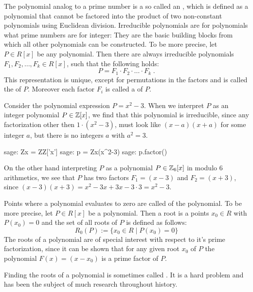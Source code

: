 The polynomial analog to a prime number is a so called an , which is defined as a polynomial that cannot be factored into the product of two non-constant polynomials using Euclidean division. Irreducible polynomials are for polynomials what prime numbers are for integer: They are the basic building blocks from which all other polynomials can be constructed. To be more precise, let $P \in R[x]$ be any polynomial. Then there are always irreducible polynomials $F_1, F_2, \ldots, F_k \in R[x]$, such that the following holds:
\begin{equation}
\label{def_polynomial_prime_factorization}
P = F_1 \cdot F_2 \cdot \ldots \cdot F_k \;.
\end{equation}
This representation is unique, except for permutations in the factors and is called the  of $P$. Moreover each factor $F_i$ is called a  of $P$. 
\begin{example}
\label{example:irreducible_integer_polynomial_1}
 Consider the polynomial expression $P=x^2-3$. When we interpret $P$ as an integer polynomial $P\in\mathbb{Z}[x]$, we find that this polynomial is irreducible, since any factorization other then $1\cdot(x^2-3)$, must look like $(x-a)(x+a)$ for some integer $a$, but there is no integers $a$ with $a^2=3$. 
\begin{sagecommandline}
sage: Zx = ZZ['x']
sage: p = Zx(x^2-3)
sage: p.factor()
\end{sagecommandline}
On the other hand interpreting $P$ as a polynomial $P\in \mathbb{Z}_6[x]$ in modulo $6$ arithmetics, we see that $P$ has two factors $F_1=(x-3)$ and $F_2=(x+3)$, since 
$(x-3)(x+3)= x^2 -3x +3x -3\cdot 3= x^2-3$. 
\end{example}
Points where a polynomial evaluates to zero are called  of the polynomial. To be more precise, let $P\in R[x]$ be a polynomial. Then a root is a points $x_0\in R$ with $P(x_0)=0$ and the set of all roots of $P$ is defined as follows:
\begin{equation}
R_0(P):=\{x_0\in R\;|\; P(x_0)=0\}
\end{equation}
The roots of a polynomial are of special interest with respect to it's prime factorization, since it can be shown that for any given root $x_0$ of $P$ the polynomial $F(x)=(x-x_0)$ is a prime factor of $P$. 

Finding the roots of a polynomial is sometimes called . It is a hard problem and has been the subject of much research throughout history. 

